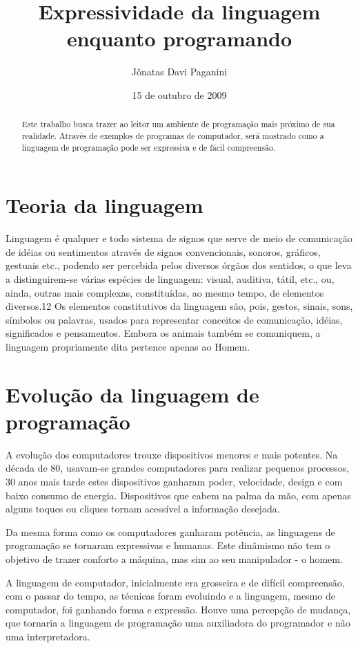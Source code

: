 \documentclass[12pt]{article}
\title{Expressividade da linguagem enquanto programando}
\author{Jônatas Davi Paganini}
\date{15 de outubro de 2009}
\begin{document}
\maketitle
\begin{abstract}
Este trabalho busca trazer ao leitor um ambiente de programação mais próximo de sua realidade. Através de exemplos de programas de computador, será mostrado como a linguagem de programação pode ser expressiva e de fácil compreensão.
\end{abstract}

\tableofcontents

\section{Teoria da linguagem}

Linguagem é qualquer e todo sistema de signos que serve de meio de comunicação de idéias ou sentimentos através de signos convencionais, sonoros, gráficos, gestuais etc., podendo ser percebida pelos diversos órgãos dos sentidos, o que leva a distinguirem-se várias espécies de linguagem: visual, auditiva, tátil, etc., ou, ainda, outras mais complexas, constituídas, ao mesmo tempo, de elementos diversos.12 Os elementos constitutivos da linguagem são, pois, gestos, sinais, sons, símbolos ou palavras, usados para representar conceitos de comunicação, idéias, significados e pensamentos. Embora os animais também se comuniquem, a linguagem propriamente dita pertence apenas ao Homem.

\cite{wikiLinguagem}

\section{Evolução da linguagem de programação}

A evolução dos computadores trouxe dispositivos menores e mais potentes. Na década de 80, usavam-se grandes computadores para realizar pequenos processos, 30 anos mais tarde estes dispositivos ganharam poder, velocidade, design e com baixo consumo de energia. Dispositivos que cabem na palma da mão, com apenas alguns toques ou cliques tornam acessível a informação desejada. 


Da mesma forma como os computadores ganharam potência, as linguagens de programação se tornaram expressivas e humanas. Este dinâmismo não tem o objetivo de trazer conforto a máquina, mas sim ao seu manipulador - o homem. 

A linguagem de computador, inicialmente era grosseira e de difícil compreensão, com o passar do tempo, as técnicas foram evoluindo e a linguagem, mesmo de computador, foi ganhando forma e expressão. Houve uma percepção de mudança, que tornaria a linguagem de programação uma auxiliadora do programador e não uma interpretadora.
\end{document}
